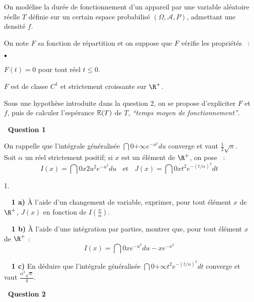 \documentclass[11pt]{article}%
\begin{document}
On modélise la durée de fonctionnement d'un appareil par une
variable aléatoire réelle $T$ définie sur un certain espace
probabilisé $(\Omega,\mathcal{A},P)$, admettant une densité $f$.

On note $F$ sa fonction de répartition et on suppose que $F$ vérifie
les
propriétés~ :

\begin{noliste}{$\scriptstyle \bullet$}
\item $F(t) = 0$ pour tout réel $t \leq 0$.

\item $F$ est de classe $C^{1}$ et strictement croissante sur $\R^+ $.
\end{noliste}

Sous une hypothèse introduite dans la question 2, on se propose
d'expliciter $F$ et $f$, puis de calculer l'espérance $\mathbb{E}(T)$ de $T$,
\emph{``temps moyen de fonctionnement''}.



\textbf{\ Question 1}

On rappelle que l'intégrale généralisée $\dint{0}{+
\infty}e^{-u^{2}}du$ converge et vaut $ \frac{1}{2} 
\sqrt{\pi}$.\\
Soit $\alpha$ un réel strictement positif; si $x$ est un élément de
$\R^+ $, on pose~ : 
\[
I(x) = \dint{0}{x}2u^{2}e^{-u^{2}}du \;\; \text{ et } \;\; J(x) =
\dint{0}{x}
t^{2}e^{-(t/\alpha)^{2}}dt
\]

\begin{noliste}{1.}
 \setlength{\itemsep}{4mm}
\item[ \ \textbf{\ 1 a)}] À l'aide d'un changement de variable,
exprimer,
pour tout élément $x$ de $\R^+ $, $J(x)$ en fonction de $
I\left(\frac{x}{ \alpha}\right)$.

\item[ \ \textbf{\ 1 b)}] À l'aide d'une intégration par parties,
montrer
que, pour tout élément $x$ de $\R^+ $ :
\[
I(x) = \dint{0}{x} e^{-u^{2}} du - x e^{-x^{2}}
\]

\item[ \ \textbf{\ 1 c)}] En déduire que l'intégrale généralisée $
\dint{0}{+ \infty} t^{2}e^{-(t/\alpha)^{2}}dt$ converge et vaut $
\frac{\alpha^{3} \sqrt{\pi}}{4}$.
\end{noliste}

\textbf{\ Question 2}
\end{document}
